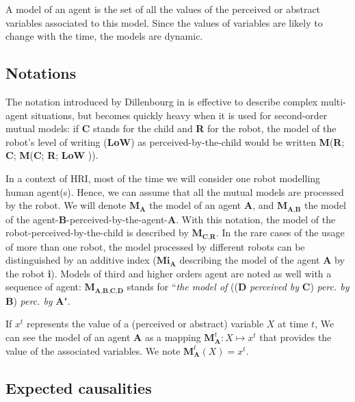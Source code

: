 \documentclass[10pt,a4paper]{article}
\begin{document}
A model of an agent is the set of all the values of the perceived or abstract variables associated to this model. Since the values of variables are likely to change with the time, the models are dynamic.

\subsection{Notations}

The notation introduced by Dillenbourg in \cite{sangin2007partner} is effective to describe complex multi-agent situations, but becomes quickly heavy when it is used for second-order mutual models: if \textbf{C} stands for the child and \textbf{R} for the robot, the model of the robot’s level of writing (\textbf{LoW}) as perceived-by-the-child would be written \textbf{M}(\textbf{R}; \textbf{C}; \textbf{M}(\textbf{C}; \textbf{R}; \textbf{LoW} )).

In a context of HRI, most of the time we will consider one robot modelling human agent(s). Hence, we can assume that all the mutual models are processed by the robot. We will denote $\textbf{M}_\textbf{A}$ the model of an agent $\textbf{A}$, and $\textbf{M}_\textbf{A,B}$ the model of the agent-\textbf{B}-perceived-by-the-agent-\textbf{A}. With this notation, the model of the robot-perceived-by-the-child is described by $\textbf{M}_\textbf{C,R}$. In the rare cases of the usage of more than one robot, the model processed by different robots can be distinguished by an additive index ($\textbf{Mi}_\textbf{A}$ describing the model of the agent \textbf{A} by the robot \textbf{i}). Models of third and higher orders agent are noted as well with a sequence of agent: $\textbf{M}_\textbf{A,B,C,D}$ stands for ``\textit{the model of} ((\textbf{D} \textit{perceived by} \textbf{C}) \textit{perc. by} \textbf{B}) \textit{perc. by} \textbf{A}".

If $x^t$ represents the value of a (perceived or abstract) variable $X$ at time $t$, We can see the model of an agent \textbf{A} as a mapping $\textbf{M}^t_\textbf{A}: X \mapsto x^t$ that provides the value of the associated variables. We note $\textbf{M}^t_\textbf{A}(X) = x^t$.

\subsection{Expected causalities}
\end{document}
